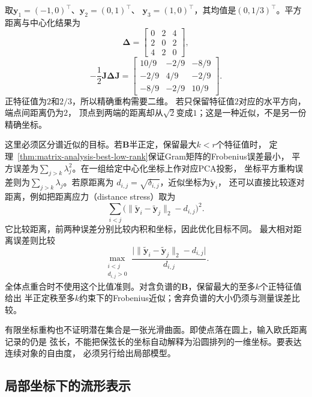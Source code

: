 \begin{example}[三个点能否放在一条直线上]
\label{ex:geometry-three-point-embedding}
取$\bm y_1=(-1,0)^\top$、$\bm y_2=(0,1)^\top$、
$\bm y_3=(1,0)^\top$，其均值是$(0,1/3)^\top$。平方距离与中心化结果为
\[
 \bm\Delta=\begin{bmatrix}0&2&4\\2&0&2\\4&2&0\end{bmatrix},
\]
\begin{equation}
 -\frac12\bm J\bm\Delta\bm J
 =\begin{bmatrix}
  10/9&-2/9&-8/9\\
  -2/9&4/9&-2/9\\
  -8/9&-2/9&10/9
 \end{bmatrix}.
 \label{eq:geometry-three-point-centered-gram}
\end{equation}
正特征值为$2$和$2/3$，所以精确重构需要二维。
若只保留特征值$2$对应的水平方向，端点间距离仍为$2$，
顶点到两端的距离却从$\sqrt2$变成$1$；这是一种近似，不是另一份精确坐标。
\end{example}

这里必须区分谱近似的目标。若$\bm B$半正定，保留最大$k<r$个特征值时，
定理~\ref{thm:matrix-analysis-best-low-rank}保证Gram矩阵的Frobenius误差最小，
平方误差为$\sum_{j>k}\lambda_j^2$。在一组给定中心化坐标上作对应PCA投影，
坐标平方重构误差则为$\sum_{j>k}\lambda_j$。若原距离为
$d_{i,j}=\sqrt{\delta_{i,j}}$，近似坐标为$\widetilde{\bm y}_i$，
还可以直接比较逐对距离，例如把距离应力（distance stress）取为
\[
 \sum_{i<j}
 \bigl(\lVert\widetilde{\bm y}_i-\widetilde{\bm y}_j\rVert_2-d_{i,j}\bigr)^2.
\]
它比较距离，前两种误差分别比较内积和坐标，因此优化目标不同。
最大相对距离误差则比较
\[
 \max_{\substack{i<j\\d_{i,j}>0}}
 \frac{\bigl|\lVert\widetilde{\bm y}_i-\widetilde{\bm y}_j\rVert_2-d_{i,j}\bigr|}
 {d_{i,j}}.
\]
全体点重合时不使用这个比值准则。对含负谱的$\bm B$，保留最大的至多$k$个正特征值给出
半正定秩至多$k$约束下的Frobenius近似；舍弃负谱的大小仍须与测量误差比较。

有限坐标重构也不证明潜在集合是一张光滑曲面。即使点落在圆上，输入欧氏距离记录的仍是
弦长，不能把保弦长的坐标自动解释为沿圆排列的一维坐标。要表达连续对象的自由度，
必须另行给出局部模型。

\subsection{局部坐标下的流形表示}
\label{sec:geometry-local-coordinate-representation}

